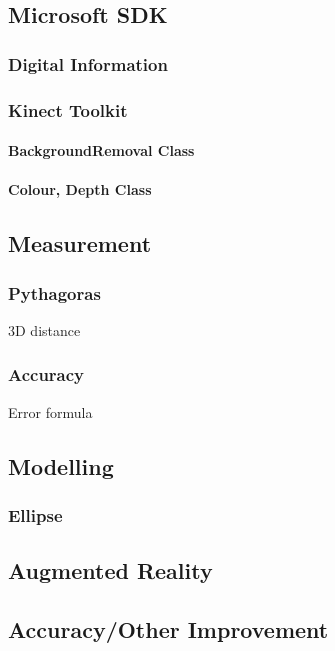 \subsection{Microsoft SDK}

\subsubsection{Digital Information}

\subsubsection{Kinect Toolkit}

\paragraph{BackgroundRemoval Class}

\paragraph{Colour, Depth Class}


\subsection{Measurement}

\subsubsection{Pythagoras}
3D distance \cite{nonContact2017}\\

\subsubsection{Accuracy}
Error formula \cite{nonContact2017}\\

\subsection{Modelling}

\subsubsection{Ellipse}


\subsection{Augmented Reality}


\subsection{Accuracy/Other Improvement }